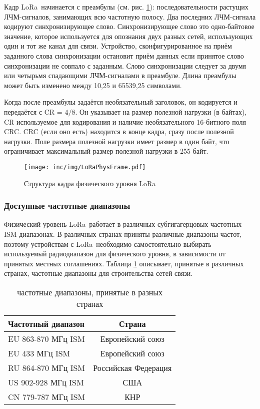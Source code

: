 Кадр LoRa\texttrademark~начинается с преамбулы (см. рис. 
\ref{fig:loraphysframe}): 
последовательности растущих ЛЧМ-сигналов, занимающих всю частотную полосу.
Два последних ЛЧМ-сигнала кодируют синхронизирующее слово.
Синхронизирующее слово это одно-байтовое значение, которое используется для 
опознания двух разных сетей, использующих один и тот же канал для связи. 
Устройство, сконфигурированное на приём заданного слова синхронизации остановит 
приём данных если принятое слово синхронизации не совпало с заданным.
Слово синхронизации следует за двумя или четырьмя спадающими ЛЧМ-сигналами в 
преамбуле.
Длина преамбулы может быть изменено между 10,25 и 65539,25 символами.

Когда после преамбулы задаётся необязательный заголовок, он кодируется и 
передаётся с CR = $4/8$.
Он указывает на размер полезной нагрузки (в байтах), CR используемое для 
кодирования и наличие необязательного 16-битного поля CRC.
CRC (если оно есть) находится в конце кадра, сразу после полезной нагрузки.
Поле размера полезной нагрузки имеет размер в один байт, что ограничивает 
максимальный размер полезной нагрузки в 255 байт.

\begin{figure}[!h]
  \centering
  \texttt{[image: inc/img/LoRaPhysFrame.pdf]}
  \caption{Структура кадра физического уровня LoRa\texttrademark}
  \label{fig:loraphysframe}
\end{figure}


\subsubsection{Доступные частотные диапазоны}

Физический уровень LoRa\texttrademark~работает в различных субгигагерцовых 
частотных ISM 
диапазонах.
В различных странах приняты различные диапазоны частот, поэтому устройствам с 
LoRa\texttrademark~необходимо самостоятельно выбирать используемый 
радиодиапазон для 
физического уровня, в зависимости от принятых местных соглашениях. 
Таблица \ref{tab:ismbands} описывает, принятые в различных странах, частотные 
диапазоны для строительства сетей связи.

\begin{table}[ht]
  \caption{частотные диапазоны, принятые в разных странах}
  \begin{tabular}{|l|c|}
  \hline
	  Частотный диапазон & Страна\\
  \hline
	  EU 863-870 МГц ISM & Европейский союз\\
  \hline
	  EU 433 МГц ISM & Европейский союз\\
  \hline
	  RU 864-870 МГц ISM & Российская Федерация\\
  \hline
	  US 902-928 МГц ISM & США\\
  \hline
	  CN 779-787 МГц ISM & КНР\\
  \hline
  \end{tabular}
  \label{tab:ismbands}
\end{table}

